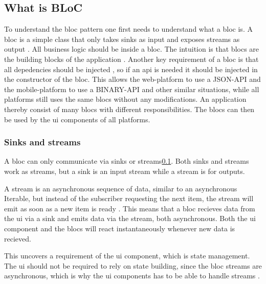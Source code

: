 \subsection{What is BLoC} \label{subsec:what_is_bloc}
To understand the \gls{bloc} pattern one first needs to understand what a \gls{bloc} is. A \gls{bloc} is a simple class that only takes sinks as input and exposes streams as output \cite[21 min 25 sec]{blocPattern}. All business logic should be inside a \gls{bloc}. The intuition is that \glspl{bloc} are the building blocks of the application \cite[21 min 25 sec]{blocPattern}. Another key requirement of a \gls{bloc} is that all depedencies should be injected \cite[22 min 55 sec]{blocPattern}, so if an api is needed it should be injected in the constructor of the \gls{bloc}. This allows the web-platform to use a JSON-API and the mobile-platform to use a BINARY-API and other similar situations, while all platforms still uses the same \glspl{bloc} without any modifications. An application thereby consist of many \glspl{bloc} with different responsibilities. The \glspl{bloc} can then be used by the \gls{ui} components of all platforms.

\subsubsection{Sinks and streams}
A \gls{bloc} can only communicate via sinks or streams\ref{subsec:what_is_bloc}. Both sinks and streams work as streams, but a sink is an input stream while a stream is for outputs.

A stream is an asynchronous sequence of data, similar to an asynchronous Iterable, but instead of the subscriber requesting the next item, the stream will emit as soon as a new item is ready \cite{dartStreams}. This means that a \gls{bloc} recieves data from the \gls{ui} via a sink and emits data via the stream, both asynchronous. Both the \gls{ui} component and the \glspl{bloc} will react instantaneously whenever new data is recieved.

This uncovers a requirement of the \gls{ui} component, which is state management. The \gls{ui} should not be required to rely on state building, since the \gls{bloc} streams are asynchronous, which is why the \gls{ui} components has to be able to handle streams \cite[4 min 40 sec \& 14min 00 sec]{blocPattern}.

